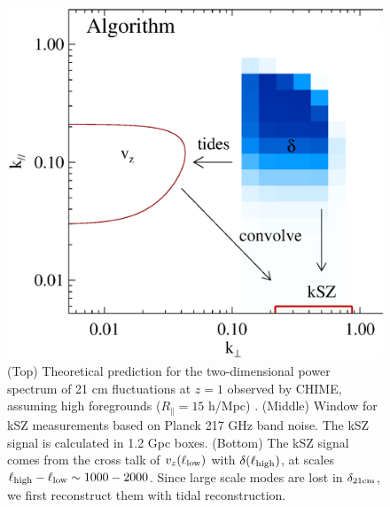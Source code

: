 \begin{figure}[tbp]
\begin{minipage}[t]{\linewidth}
\includegraphics[width=\textwidth]{figure/demo_convolution.eps}
\vspace{-0.6cm}
\end{minipage}
\caption{
(Top) Theoretical prediction for the two-dimensional power spectrum of 21 cm fluctuations at $z=1$ observed by CHIME, assuming high foregrounds ($R_\parallel=15$ h/Mpc) . (Middle) Window for kSZ measurements based on Planck 217 GHz band noise. The kSZ signal is calculated in 1.2 Gpc boxes.
(Bottom) The kSZ signal comes from the cross talk of $v_z(\ell_\mathrm{low})$ with $\delta(\ell_\mathrm{high})$, at scales $\ell_\mathrm{high}-\ell_\mathrm{low}\sim1000-2000$. Since large scale modes are lost in $\delta_\mathrm{21cm}$, we first reconstruct them with tidal reconstruction.  
}
\end{figure}
